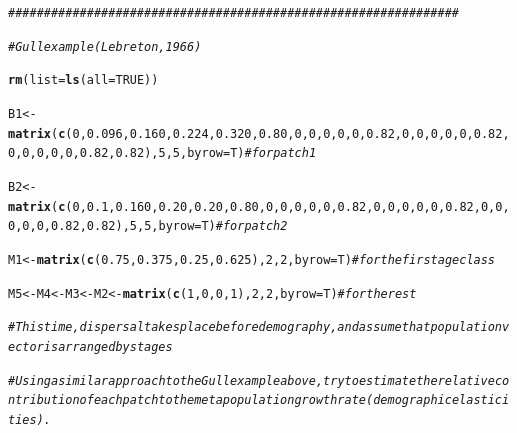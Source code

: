 \documentclass{article}\usepackage[]{graphicx}\usepackage[]{color}
\makeatletter
\newcommand{\hlnum}[1]{\textcolor[rgb]{0.686,0.059,0.569}{#1}}%
\newcommand{\hlcom}[1]{\textcolor[rgb]{0.678,0.584,0.686}{\textit{#1}}}%
\newcommand{\hlstd}[1]{\textcolor[rgb]{0.345,0.345,0.345}{#1}}%
\newcommand{\hlkwb}[1]{\textcolor[rgb]{0.69,0.353,0.396}{#1}}%
\newcommand{\hlkwc}[1]{\textcolor[rgb]{0.333,0.667,0.333}{#1}}%
\newcommand{\hlkwd}[1]{\textcolor[rgb]{0.737,0.353,0.396}{\textbf{#1}}}%
\newenvironment{kframe}{%
 \def\at@end@of@kframe{}%
 \ifinner\ifhmode%
  \def\at@end@of@kframe{\end{minipage}}%
  \begin{minipage}{\columnwidth}%
 \fi\fi%
 \def\FrameCommand##1{\hskip\@totalleftmargin \hskip-\fboxsep
 \colorbox{shadecolor}{##1}\hskip-\fboxsep
     \hskip-\linewidth \hskip-\@totalleftmargin \hskip\columnwidth}%
 \MakeFramed {\advance\hsize-\width
   \@totalleftmargin\z@ \linewidth\hsize
   \@setminipage}}%
 {\par\unskip\endMakeFramed%
 \at@end@of@kframe}
\newenvironment{knitrout}{}{} %
\makeatother
\begin{document}
\begin{knitrout}
\begin{kframe}
{\ttfamily\noindent\bfseries\color{errorcolor}{\#\# Error in eval(expr, envir, enclos): object 'Msens' not found}}\begin{alltt}
\hlcom{###############################################################}


\hlcom{# Gull example (Lebreton, 1966)}

\hlkwd{rm}\hlstd{(}\hlkwc{list}\hlstd{=}\hlkwd{ls}\hlstd{(}\hlkwc{all}\hlstd{=}\hlnum{TRUE}\hlstd{))}

\hlstd{B1}\hlkwb{<-}\hlkwd{matrix}\hlstd{(}\hlkwd{c}\hlstd{(}\hlnum{0}\hlstd{,}\hlnum{0.096}\hlstd{,}\hlnum{0.160}\hlstd{,}\hlnum{0.224}\hlstd{,}\hlnum{0.320}\hlstd{,}\hlnum{0.80}\hlstd{,}\hlnum{0}\hlstd{,}\hlnum{0}\hlstd{,}\hlnum{0}\hlstd{,}\hlnum{0}\hlstd{,}\hlnum{0}\hlstd{,}\hlnum{0.82}\hlstd{,}\hlnum{0}\hlstd{,}\hlnum{0}\hlstd{,}\hlnum{0}\hlstd{,}\hlnum{0}\hlstd{,}\hlnum{0}\hlstd{,}\hlnum{0.82}\hlstd{,}\hlnum{0}\hlstd{,}\hlnum{0}\hlstd{,}\hlnum{0}\hlstd{,}\hlnum{0}\hlstd{,}\hlnum{0}\hlstd{,}\hlnum{0.82}\hlstd{,}\hlnum{0.82}\hlstd{),}\hlnum{5}\hlstd{,}\hlnum{5}\hlstd{,}\hlkwc{byrow}\hlstd{=T)}    \hlcom{# for patch 1}

\hlstd{B2}\hlkwb{<-}\hlkwd{matrix}\hlstd{(}\hlkwd{c}\hlstd{(}\hlnum{0}\hlstd{,}\hlnum{0.1}\hlstd{,}\hlnum{0.160}\hlstd{,}\hlnum{0.20}\hlstd{,}\hlnum{0.20}\hlstd{,}\hlnum{0.80}\hlstd{,}\hlnum{0}\hlstd{,}\hlnum{0}\hlstd{,}\hlnum{0}\hlstd{,}\hlnum{0}\hlstd{,}\hlnum{0}\hlstd{,}\hlnum{0.82}\hlstd{,}\hlnum{0}\hlstd{,}\hlnum{0}\hlstd{,}\hlnum{0}\hlstd{,}\hlnum{0}\hlstd{,}\hlnum{0}\hlstd{,}\hlnum{0.82}\hlstd{,}\hlnum{0}\hlstd{,}\hlnum{0}\hlstd{,}\hlnum{0}\hlstd{,}\hlnum{0}\hlstd{,}\hlnum{0}\hlstd{,}\hlnum{0.82}\hlstd{,}\hlnum{0.82}\hlstd{),}\hlnum{5}\hlstd{,}\hlnum{5}\hlstd{,}\hlkwc{byrow}\hlstd{=T)} \hlcom{# for patch 2}

\hlstd{M1}\hlkwb{<-}\hlkwd{matrix}\hlstd{(}\hlkwd{c}\hlstd{(}\hlnum{0.75}\hlstd{,}\hlnum{0.375}\hlstd{,}\hlnum{0.25}\hlstd{,}\hlnum{0.625}\hlstd{),}\hlnum{2}\hlstd{,}\hlnum{2}\hlstd{,}\hlkwc{byrow}\hlstd{=T)}  \hlcom{# for the first age class}

\hlstd{M5}\hlkwb{<-}\hlstd{M4}\hlkwb{<-}\hlstd{M3}\hlkwb{<-}\hlstd{M2}\hlkwb{<-}\hlkwd{matrix}\hlstd{(}\hlkwd{c}\hlstd{(}\hlnum{1}\hlstd{,}\hlnum{0}\hlstd{,}\hlnum{0}\hlstd{,}\hlnum{1}\hlstd{),}\hlnum{2}\hlstd{,}\hlnum{2}\hlstd{,}\hlkwc{byrow}\hlstd{=T)} \hlcom{# for the rest}


\hlcom{# This time, dispersal takes place before demography, and assume that population vector is arranged by stages}

\hlcom{# Using a similar approach to the Gull example above, try to estimate the relative contribution of each patch to the metapopulation growth rate (demographic elasticities).}
\end{alltt}
\end{kframe}
\end{knitrout}
\end{document}
